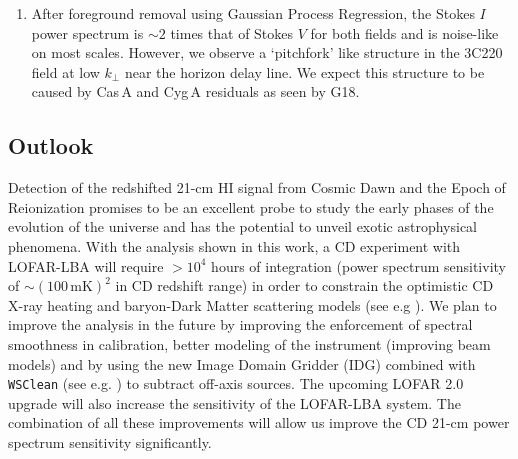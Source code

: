 \documentclass[fleqn,usenatbib]{mnras}
\begin{document}
\begin{enumerate}
\item After foreground removal using Gaussian Process Regression, the Stokes $I$ power spectrum is $\sim 2$ times that of Stokes $V$ for both fields and is noise-like on most scales. However, we observe a `pitchfork' like structure in the 3C220 field at low $k_{\perp}$ near the horizon delay line. We expect this structure to be caused by Cas\,A and Cyg\,A residuals as seen by G18.

\end{enumerate}

\subsection{Outlook}

Detection of the redshifted 21-cm HI signal from Cosmic Dawn and the Epoch of Reionization promises to be an excellent probe to study the early phases of the evolution of the universe and has the potential to unveil exotic astrophysical phenomena. With the analysis shown in this work, a CD experiment with LOFAR-LBA will require $>10^4$ hours of integration (power spectrum sensitivity of $\sim(100\,\text{mK})^2$ in CD redshift range) in order to constrain the optimistic CD X-ray heating and baryon-Dark Matter scattering models (see e.g \citealt{fialkov2018,cohen2018}). We plan to improve the analysis in the future by improving the enforcement of spectral smoothness in calibration, better modeling of the instrument (improving beam models) and by using the new Image Domain Gridder (IDG) combined with \texttt{WSClean} (see e.g. \citealt{veenboer2017,vandertol2018}) to subtract off-axis sources. The upcoming LOFAR 2.0 upgrade will also increase the sensitivity of the LOFAR-LBA system. The combination of all these improvements will allow us improve the CD 21-cm power spectrum sensitivity significantly.
\end{document}
